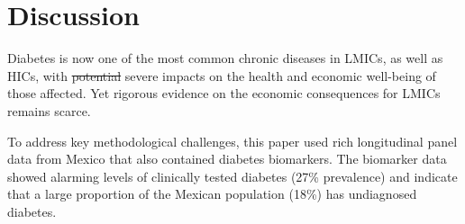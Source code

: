 \documentclass[12pt,english]{article}
\providecommand{\DIFdeltex}[1]{{\protect\color{red}\sout{#1}}}                      %
\providecommand{\DIFdelbegin}{} %
\providecommand{\DIFdelend}{} %
\providecommand{\DIFdel}[1]{\texorpdfstring{\DIFdeltex{#1}}{}} %
\begin{document}
\FloatBarrier

\section{\label{sec:cha_4_conclusion}Discussion}

Diabetes is now one of the most common chronic diseases in \acp{LMIC}, as well as \acp{HIC}, with \DIFdelbegin \DIFdel{potential }\DIFdelend severe impacts on the health and economic well-being of those affected.  Yet rigorous evidence on the economic consequences for \acp{LMIC} remains scarce.

To address key methodological challenges, this paper used rich longitudinal panel data from Mexico that also contained diabetes biomarkers. The biomarker data showed alarming levels of clinically tested diabetes (27\% prevalence) and indicate that a large proportion of the Mexican population (18\%) has undiagnosed diabetes.
\end{document}
